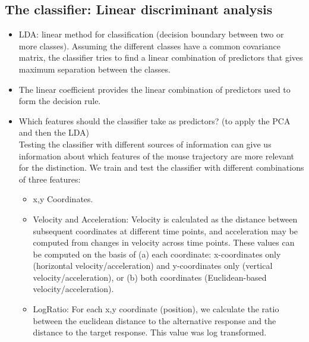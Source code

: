 \documentclass{article}
\newcommand{\addMM}[1]{{\leavevmode\color{red}#1}}
\begin{document}
\subsection{The classifier: Linear discriminant analysis}
\begin{itemize}
\item LDA: linear method for classification (decision boundary between two or more classes). Assuming the different classes have a common covariance matrix, the classifier tries to find a linear combination of predictors that gives maximum separation between the classes. 

\item The linear coefficient provides the linear combination of predictors used to form the decision rule. 

\item Which features should the classifier take as predictors? \addMM{(to apply the PCA and then the LDA)}\\
Testing the classifier with different sources of information can give us information about which features of the mouse trajectory are more relevant for the distinction. We train and test the classifier with different combinations of three features:

\begin{itemize}
\item x,y Coordinates. 

\item Velocity and Acceleration: Velocity is calculated as the distance between subsequent coordinates at different time points, and acceleration may be computed from changes in velocity across time points. 
These values can be computed on the basis of (a) each coordinate: x-coordinates only (horizontal velocity/acceleration) and y-coordinates only (vertical velocity/acceleration), or (b) both coordinates (Euclidean-based velocity/acceleration). 

\item LogRatio: For each x,y coordinate (position), we calculate the ratio between the euclidean distance to the alternative response and the distance to the target response. This value was log transformed. 
\end{itemize}



\end{itemize}
\end{document}
